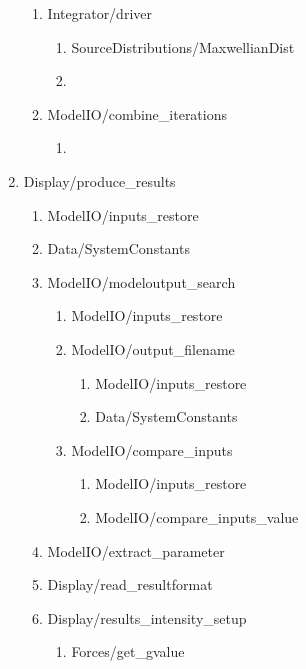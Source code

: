 \documentclass[11pt]{article}
\begin{document}
\begin{enumerate}
\begin{enumerate}
  \item Integrator/driver
    \begin{enumerate}
    \item SourceDistributions/MaxwellianDist
    \item \color{red}{continue}
    \end{enumerate}
  \item ModelIO/combine\_iterations
    \begin{enumerate}
    \item \color{red}{continue}
    \end{enumerate}
  \end{enumerate}

\item Display/produce\_results
  \begin{enumerate}
  \item ModelIO/inputs\_restore
  \item Data/SystemConstants
  \item ModelIO/modeloutput\_search
    \begin{enumerate}
    \item ModelIO/inputs\_restore
    \item ModelIO/output\_filename
      \begin{enumerate}
      \item ModelIO/inputs\_restore
      \item Data/SystemConstants
      \end{enumerate}
    \item ModelIO/compare\_inputs
      \begin{enumerate}
      \item ModelIO/inputs\_restore
      \item ModelIO/compare\_inputs\_value
      \end{enumerate}
    \end{enumerate}
  \item ModelIO/extract\_parameter
  \item Display/read\_resultformat
  \item Display/results\_intensity\_setup
    \begin{enumerate}
    \item Forces/get\_gvalue
    \end{enumerate}


\end{enumerate}
\end{enumerate}
\end{document}
